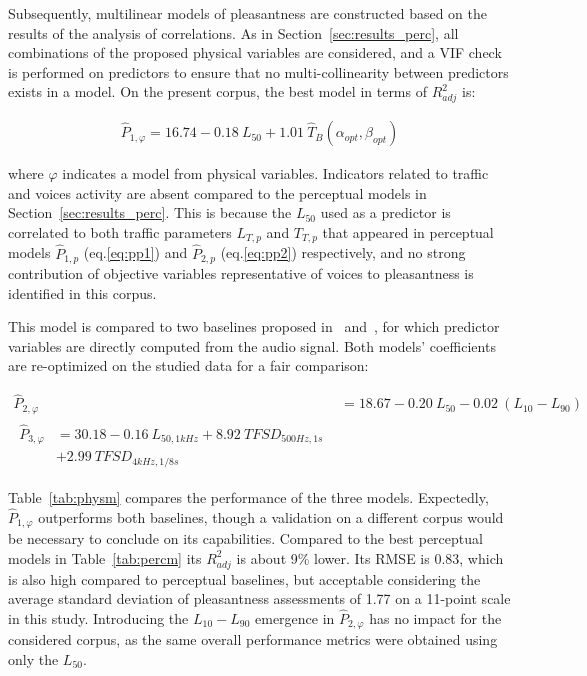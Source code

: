 \documentclass[twocolumn]{article}
\begin{document}
Subsequently, multilinear models of pleasantness are constructed based on the results of the analysis of correlations. As in Section~\ref{sec:results_perc}, all combinations of the proposed physical variables are considered, and a VIF check is performed on predictors to ensure that no multi-collinearity between predictors exists in a model. On the present corpus, the best model in terms of $R^2_{adj}$ is:

\begin{align}
\hat P_{1, \varphi} = 16.74 - 0.18~L_{50} + 1.01~\hat T_B(\alpha_{opt}, \beta_{opt}) \label{eq:pphi}
\end{align}

where $\varphi$ indicates a model from physical variables. Indicators related to traffic and voices activity are absent compared to the perceptual models in Section~\ref{sec:results_perc}. This is because the $L_{50}$ used as a predictor is correlated to both traffic parameters $L_{T, p}$ and $T_{T, p}$ that appeared in perceptual models $\hat P_{1, p}$ (eq.\ref{eq:pp1}) and $\hat P_{2, p}$ (eq.\ref{eq:pp2}) respectively, and no strong contribution of objective variables representative of voices to pleasantness is identified in this corpus.

This model is compared to two baselines proposed in~\cite{ricciardi2014} and~\cite{aumond2017}, for which predictor variables are directly computed from the audio signal. Both models' coefficients are re-optimized on the studied data for a fair comparison:

\begin{align}
\hat P_{2, \varphi} &= 18.67 - 0.20~L_{50} - 0.02~(L_{10}-L_{90})\\
\begin{split}
\hat P_{3, \varphi} &= 30.18 - 0.16~L_{50, 1kHz} + 8.92~TFSD_{500Hz, 1s} \\
& + 2.99~TFSD_{4kHz, 1/8s}
\end{split}
\end{align}

Table~\ref{tab:physm} compares the performance of the three models. Expectedly, $\hat P_{1, \varphi}$ outperforms both baselines, though a validation on a different corpus would be necessary to conclude on its capabilities. Compared to the best perceptual models in Table~\ref{tab:percm} its $R^2_{adj}$ is about 9\% lower. Its RMSE is 0.83, which is also high compared to perceptual baselines, but acceptable considering the average standard deviation of pleasantness assessments of 1.77 on a 11-point scale in this study. Introducing the $L_{10}-L_{90}$ emergence in $\hat P_{2, \varphi}$ has no impact for the considered corpus, as the same overall performance metrics were obtained using only the $L_{50}$.
\end{document}

